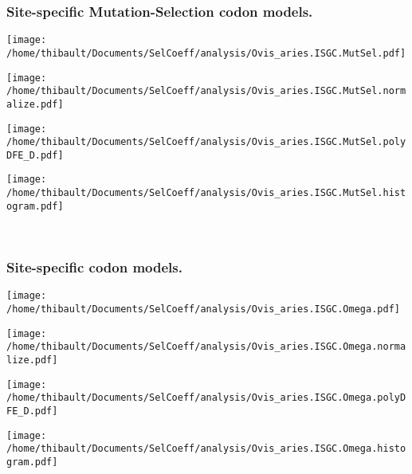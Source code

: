 \subsubsection*{Site-specific Mutation-Selection codon models.} 
\begin{minipage}{0.49\linewidth} 
\texttt{[image: /home/thibault/Documents/SelCoeff/analysis/Ovis\_aries.ISGC.MutSel.pdf]} 
\end{minipage}
\begin{minipage}{0.49\linewidth} 
\texttt{[image: /home/thibault/Documents/SelCoeff/analysis/Ovis\_aries.ISGC.MutSel.normalize.pdf]} 
\end{minipage}
\begin{minipage}{0.49\linewidth} 
\texttt{[image: /home/thibault/Documents/SelCoeff/analysis/Ovis\_aries.ISGC.MutSel.polyDFE\_D.pdf]} 
\end{minipage}
\begin{minipage}{0.49\linewidth} 
\texttt{[image: /home/thibault/Documents/SelCoeff/analysis/Ovis\_aries.ISGC.MutSel.histogram.pdf]} 
\end{minipage}
\\ 
\subsubsection*{Site-specific codon models.} 
\begin{minipage}{0.49\linewidth} 
\texttt{[image: /home/thibault/Documents/SelCoeff/analysis/Ovis\_aries.ISGC.Omega.pdf]} 
\end{minipage}
\begin{minipage}{0.49\linewidth} 
\texttt{[image: /home/thibault/Documents/SelCoeff/analysis/Ovis\_aries.ISGC.Omega.normalize.pdf]} 
\end{minipage}
\begin{minipage}{0.49\linewidth} 
\texttt{[image: /home/thibault/Documents/SelCoeff/analysis/Ovis\_aries.ISGC.Omega.polyDFE\_D.pdf]} 
\end{minipage}
\begin{minipage}{0.49\linewidth} 
\texttt{[image: /home/thibault/Documents/SelCoeff/analysis/Ovis\_aries.ISGC.Omega.histogram.pdf]} 
\end{minipage}
\\ 
